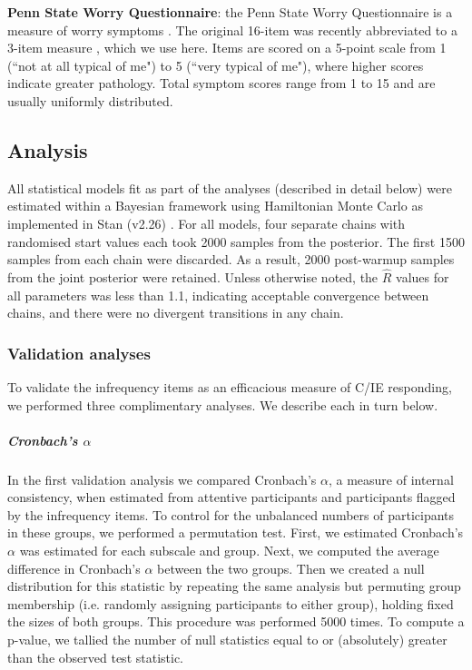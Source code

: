 \documentclass[a4paper,notitlepage,12pt]{article}
\begin{document}
\textbf{Penn State Worry Questionnaire}: the Penn State Worry Questionnaire is a measure of worry symptoms \cite{meyer1990development}. The original 16-item was recently abbreviated to a 3-item measure \cite{kertz2014psychometric}, which we use here. Items are scored on a 5-point scale from 1 (``not at all typical of me") to 5 (``very typical of me"), where higher scores indicate greater pathology. Total symptom scores range from 1 to 15 and are usually uniformly distributed.

\subsection{Analysis}

All statistical models fit as part of the analyses (described in detail below) were estimated within a Bayesian framework using Hamiltonian Monte Carlo as implemented in Stan (v2.26) \cite{stan}. For all models, four separate chains with randomised start values each took 2000 samples from the posterior. The first 1500 samples from each chain were discarded. As a result, 2000 post-warmup samples from the joint posterior were retained. Unless otherwise noted, the $\hat{R}$ values for all parameters was less than 1.1, indicating acceptable convergence between chains, and there were no divergent transitions in any chain. 

\subsubsection{Validation analyses}

To validate the infrequency items as an efficacious measure of C/IE responding, we performed three complimentary analyses. We describe each in turn below.

\subparagraph{Cronbach's $\alpha$} In the first validation analysis we compared Cronbach's $\alpha$, a measure of internal consistency, when estimated from attentive participants and participants flagged by the infrequency items. To control for the unbalanced numbers of participants in these groups, we performed a permutation test. First, we estimated Cronbach's $\alpha$ was estimated for each subscale and group. Next, we computed the average difference in Cronbach's $\alpha$ between the two groups. Then we created a null distribution for this statistic by repeating the same analysis but permuting group membership (i.e. randomly assigning participants to either group), holding fixed the sizes of both groups. This procedure was performed 5000 times. To compute a p-value, we tallied the number of null statistics equal to or (absolutely) greater than the observed test statistic. 
\end{document}
